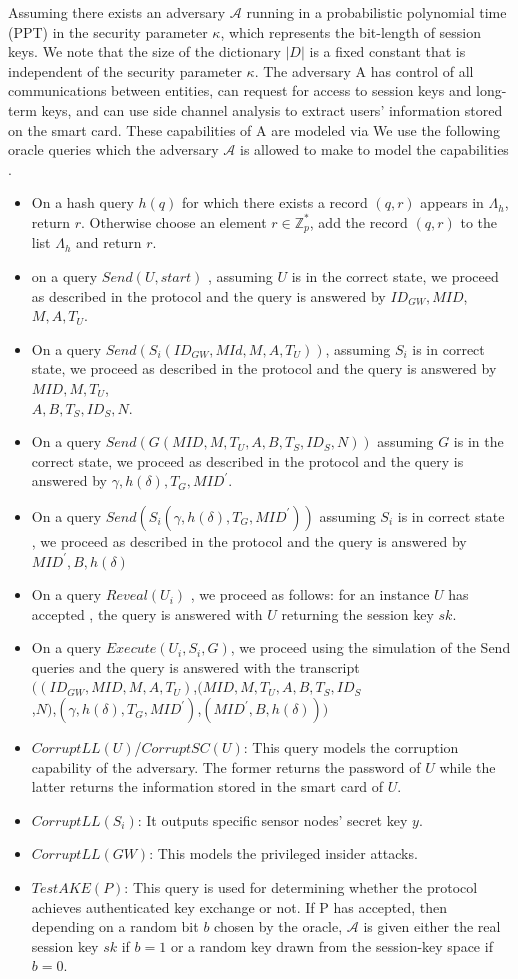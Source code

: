 \documentclass[a4paper,12pt]{report}
\begin{document}
 Assuming there exists an adversary $\mathcal{A}$ running in a probabilistic polynomial time (PPT) in the
security parameter $\kappa$, which represents the bit-length of
session keys. We note that the size of the dictionary $|D|$ is a
fixed constant that is independent of the security parameter
$\kappa$. The adversary A has control of all communications between
entities, can request for access to session keys and long-term keys,
and can use side channel analysis to extract users' information
stored on the smart card. These capabilities of A are modeled via We
use the following oracle queries which the adversary $\mathcal{A}$
is allowed to make to model the capabilities .
\begin{itemize}
\item On a hash query $h(q)$ for which there exists a record $(q,r)$ appears in $\Lambda_h$, return $r$. Otherwise choose an element $r \in \mathbb{Z}_{p}^{*}$, add the record $(q,r)$ to the list $\Lambda_h$ and return $r$.
\item on a query $Send(U,start)$ , assuming $U$ is in the correct state, we proceed as described in the protocol and the query is answered by $ID_{GW},MID$, $M,A,T_U$.
\item On a query $Send(S_{i}(ID_{GW},MId,M,A,T_U))$, assuming $S_{i}$ is in correct state, we proceed as described in the protocol and the query is answered by  $MID,M, T_U $,\\ $A,B,T_S,ID_S,N$.
\item On a query $Send(G(MID,M,T_U, A,B,T_S,ID_S,N))$ assuming $G$ is in the correct state, we proceed as described in the protocol and the query is answered by $\gamma,h(\delta),T_G,MID^{\prime}$.
\item On a query $Send(S_{i}(\gamma,h(\delta),T_G,MID^{\prime}))$ assuming $S_{i}$ is in correct state , we proceed as described in the protocol and the query is answered by $MID^{\prime},B,h(\delta)$
\item On a query $Reveal(U_{i})$ , we proceed as follows: for an instance $U$ has accepted , the query is answered with $U$ returning the session key $sk$.
\item On a query $Execute(U_{i},S_{i},G)$, we proceed using the simulation of the Send queries and the query is answered with the transcript $((ID_{GW},MID,M,A,T_U)$,$(MID,M,T_U, A,B,T_S,ID_S$\\,$N)$,$(\gamma,h(\delta),T_G,MID^{\prime})$,$(MID^{\prime},B,h(\delta)))$
\item $CorruptLL(U)$/$CorruptSC(U)$: This query models the corruption capability of the adversary. The former returns the password of $U$ while the latter returns the information stored in the smart card of $U$.
\item $CorruptLL(S_i)$: It outputs specific sensor nodes' secret key $y$.
\item $CorruptLL(GW)$: This models the privileged insider attacks.
\item $TestAKE(P)$: This query is used for determining whether the protocol achieves authenticated key exchange or not. If P has accepted, then depending on a random bit $b$ chosen by the oracle, $\mathcal{A}$ is given either the real session key $sk$ if $b = 1$ or a random key drawn from the session-key space if $b = 0$.


\end{itemize}
\end{document}

